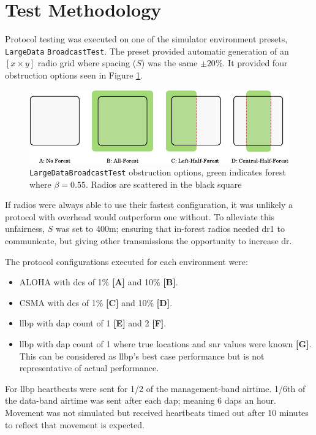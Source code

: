 \section{Test Methodology}
Protocol testing was executed on one of the simulator environment presets, \texttt{LargeData} \texttt{BroadcastTest}. The preset provided automatic generation of an $[x \times y]$ radio grid where spacing ($S$) was the same $\pm 20\%$. It provided four obstruction options seen in Figure \ref{fig:large_broadcast_options}.

\begin{figure}[H]
    \centering
   	\includegraphics{Figures/test_environments}
    \caption[\texttt{LargeDataBroadcastTest} obstruction options]{
    	\texttt{LargeDataBroadcastTest} obstruction options, green indicates forest where $\beta = 0.55$. Radios are scattered in the black square
    }
    \label{fig:large_broadcast_options}
\end{figure}
If radios were always able to use their fastest configuration, it was unlikely a protocol with overhead would outperform one without. To alleviate this unfairness, $S$ was set to 400m; ensuring that in-forest radios needed \ac{dr}1 to communicate, but giving other transmissions the opportunity to increase \ac{dr}. 

The protocol configurations executed for each environment were:
\vspace{-5mm}
\begin{itemize}
\item ALOHA with \ac{dc}s of 1\% \textbf{[A]} and 10\% \textbf{[B]}.
\item CSMA with \ac{dc}s of 1\% \textbf{[C]} and 10\% \textbf{[D]}.
\item \ac{llbp} with \ac{dap} count of 1 \textbf{[E]} and 2 \textbf{[F]}.
\item \ac{llbp} with \ac{dap} count of 1 where true locations and \ac{snr} values were known \textbf{[G]}. This can be considered as \ac{llbp}'s best case performance but is not representative of actual performance. 
\end{itemize}
\vspace{-5mm}
For \ac{llbp} heartbeats were sent for 1/2 of the management-band airtime. 1/6th of the data-band airtime was sent after each \ac{dap}; meaning 6 \ac{dap}s an hour. Movement was not simulated but received heartbeats timed out after 10 minutes to reflect that movement is expected.

